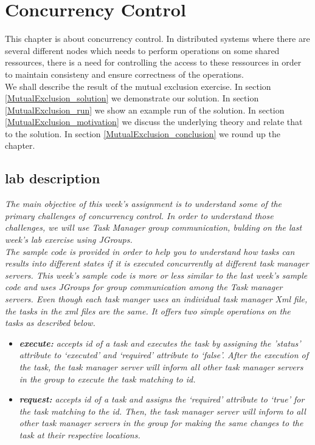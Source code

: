 \chapter{Concurrency Control}
\minitoc

This chapter is about concurrency control. In distributed systems where there are several different nodes which needs to perform operations on some shared ressources, there is a need for controlling the access to these ressources in order to maintain consisteny and ensure correctness of the operations. \\

We shall describe the result of the mutual exclusion exercise. In section \ref{MutualExclusion_solution} we demonstrate our solution. In section \ref{MutualExclusion_run} we show an example run of the solution. In section \ref{MutualExclusion_motivation} we discuss the underlying theory and relate that to the solution. In section \ref{MutualExclusion_conclusion} we round up the chapter.

\section{lab description}
\textit{The main objective of this week’s assignment is to understand some of the primary challenges of concurrency control. In order to understand those challenges, we will use Task Manager group communication, bulding on the last week’s lab exercise using JGroups.}\\

\textit{The sample code is provided in order to help you to understand how tasks can results into different states if it is executed concurrently at different task manager servers. This week’s sample code is more or less similar to the last week’s sample code and uses JGroups for group communication among the Task manager servers. Even though each task manger uses an individual task manager Xml file, the tasks in the xml files are the same. It offers two simple operations on the tasks as described below.}

\begin{itemize}
\item \textit{\textbf{execute:} accepts id of a task and executes the task by assigning the ’status’ attribute to ‘executed’ and ‘required’ attribute to ‘false’. After the execution of the task, the task manager server will inform all other task manager servers in the group to execute the task matching to id.}
\item \textit{\textbf{request:} accepts id of a task and assigns the ‘required’ attribute to ‘true’ for the task matching to the id. Then, the task manager server will inform to all other task manager servers in the group for making the same changes to the task at their respective locations.}
\end{itemize}

